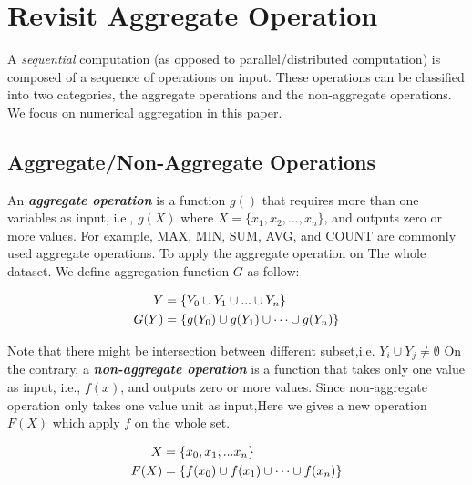 \documentclass{vldb}
\begin{document}
\section{Revisit Aggregate Operation}
\label{sec:aggre}

A \emph{sequential} computation (as opposed to parallel/distributed computation) is composed of a sequence of operations on input. These operations can be classified into two categories, the aggregate operations and the non-aggregate operations. We focus on numerical aggregation in this paper.
 \subsection{Aggregate/Non-Aggregate Operations}
An \emph{\textbf{aggregate operation}} is a function $g()$ that requires more than one variables as input, i.e., $g(X)$ where $X=\{x_1, x_2, \ldots, x_n\}$, and outputs zero or more values. For example, MAX, MIN, SUM, AVG, and COUNT are commonly used aggregate operations.%
To apply the aggregate operation on The whole dataset. We define aggregation function $G$ as follow: 
\begin{definition}
	\begin{align}
		 Y&=\{Y_0 \cup Y_1 \cup ... \cup Y_n\}\notag\\	 
	 G(Y)&=\{g(Y_0) \cup g(Y_1) \cup \dots \cup g(Y_n)\} \notag
 \end{align}
\end{definition}
Note that there might be intersection between different subset,i.e. $Y_i \cup Y_j \neq \emptyset $
On the contrary, a \emph{\textbf{non-aggregate operation}} is a function that takes only one value as input, i.e., $f(x)$, and outputs zero or more values. Since non-aggregate operation only takes one value unit as input,Here we gives a new operation $F(X)$ which apply $f$ on the whole set.\begin{definition}
	\begin{align}
	X&=\{x_0, x_1, ... x_n\}\notag\\	 
	F(X)&=\{f(x_0) \cup f(x_1) \cup \dots \cup f(x_n)\} \notag
	\end{align}
\end{definition}
\end{document}
